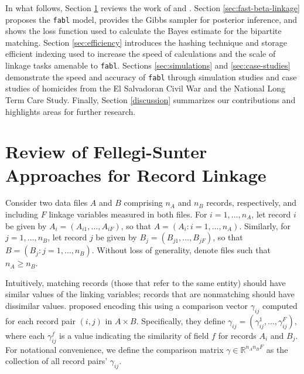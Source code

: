 \documentclass[ba]{imsart}
\begin{document}

In what follows, Section \ref{sec:review-of_prior-work} reviews the work of \cite{fellegi_theory_1969} and \cite{sadinle_bayesian_2017}. Section \ref{sec:fast-beta-linkage} proposes the \texttt{fabl} model, provides the Gibbs sampler for posterior inference, and shows the loss function used to calculate the Bayes estimate for the bipartite matching. Section \ref{sec:efficiency} introduces the hashing technique and storage efficient indexing used to increase the speed of calculations and the scale of linkage tasks amenable to \texttt{fabl}. Sections \ref{sec:simulations} and \ref{sec:case-studies} demonstrate the speed and accuracy of \texttt{fabl} through simulation studies and case studies of homicides from the El Salvadoran Civil War and the National Long Term Care Study. Finally, Section \ref{discussion} summarizes our contributions and highlights areas for further research.

\section{Review of Fellegi-Sunter Approaches for Record Linkage}
\label{sec:review-of_prior-work}

Consider two data files $A$ and $B$ comprising $n_A$ and $n_B$ records, respectively, and including $F$ linkage variables measured in both files. For $i=1, \dots, n_A$, let record $i$ be given by $A_i = (A_{i1}, \dots, A_{iF})$, so that $A = (A_i : i = 1, \dots, n_A)$.  Similarly, for $j=1, \dots, n_B$, let record $j$ be given by $B_j = (B_{j1}, \dots, B_{jF})$, so that $B = (B_j : j = 1, \dots, n_B)$.  Without loss of generality, denote files such that $n_A \geq n_B$.


Intuitively, matching records (those that refer to the same entity) should have similar values of the linking variables; records that are nonmatching should have dissimilar values. \cite{fellegi_theory_1969} proposed encoding this using a comparison vector $\gamma_{ij}$ computed for each record pair $(i,j)$ in $A \times B.$  Specifically, they define $\gamma_{ij} = (\gamma_{ij}^1, \ldots, \gamma_{ij}^F),$ where each $\gamma_{ij}^f$ is a value indicating the similarity of field $f$ for records $A_i$ and $B_j$. For notational convenience, we define the comparison matrix $\gamma \in \mathbb{R}^{n_A n_B F}$ as the collection of all record pairs' $\gamma_{ij}$.  
\end{document}

